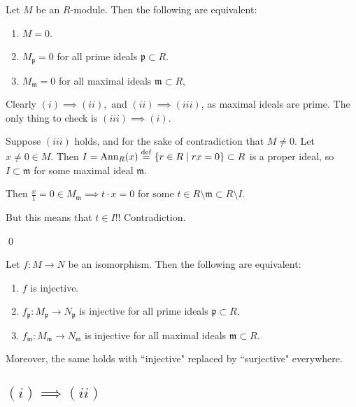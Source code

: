\documentclass[x11names,reqno,14pt]{extarticle}
\newcommand{\mk}[1]{\mathfrak{#1}}
\begin{document}
Let $M$ be an $R$-module. Then the following are equivalent:

\begin{enumerate}[label=(\roman*)]

\item $M = 0$. 

\item $M_\mk{p} = 0$ for all prime ideals $\mk{p}\subset R$.

\item $M_\mk{m} = 0$ for all maximal ideals $\mk{m} \subset R$,

\end{enumerate}

\proof

Clearly $(i)\implies(ii),$ and $(ii)\implies(iii)$, as maximal ideals are prime. The only thing to check is $(iii)\implies(i)$.

Suppose $(iii)$ holds, and for the sake of contradiction that $M\neq0$. Let $x\neq0\in M$. Then $I = \operatorname{\mathrm{Ann}}_R(x) \overset{\mathrm{def}}{=} \{r\in R \mid rx = 0\}\subset R$ is a proper ideal, so $I\subset \mk{m}$ for some maximal ideal $\mk{m}$. 

Then $\frac{x}{1} = 0 \in M_{\mk{m}} \implies t\cdot x=0$ for some $t \in R\setminus\mk{m}\subset R\setminus I$. 

But this means that $t \in I$!! Contradiction.

\qed

\cor

Let $f:M\to N$ be an isomorphism. Then the following are equivalent:

\begin{enumerate}[label=(\roman*)]

\item $f$ is injective. 

\item $f_{\mk{p}}:M_{\mk{p}}\to N_{\mk{p}}$ is injective for all prime ideals $\mk{p}\subset R$. 

\item $f_{\mk{m}}:M_\mk{m}\to N_\mk{m}$ is injective for all maximal ideals $\mk{m}\subset R$. 

\end{enumerate}

Moreover, the same holds with ``injective" replaced by ``surjective" everywhere. 

\proof

\subsection*{$(i)\implies(ii)$}
\end{document}

